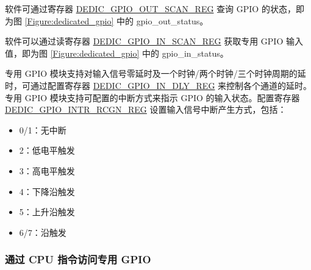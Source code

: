 \documentclass[main\_\_CN.tex]{subfiles}
\begin{document}
软件可通过寄存器 \hyperref[regdesc:DEDICGPIOOUTSCANREG]{DEDIC\_GPIO\_OUT\_SCAN\_REG} 查询 GPIO 的状态，即为图 \ref{Figure:dedicated_gpio} 中的 gpio\_out\_status。


软件可以通过读寄存器 \hyperref[regdesc:DEDICGPIOINSCANREG]{DEDIC\_GPIO\_IN\_SCAN\_REG} 获取专用 GPIO 输入值，即为图 \ref{Figure:dedicated_gpio} 中的 gpio\_in\_status。

专用 GPIO 模块支持对输入信号零延时及一个时钟/两个时钟/三个时钟周期的延时，可通过配置寄存器 \hyperref[regdesc:DEDICGPIOINDLYREG]{DEDIC\_GPIO\_IN\_DLY\_REG} 来控制各个通道的延时。 专用 GPIO 模块支持可配置的中断方式来指示 GPIO 的输入状态。配置寄存器 \hyperref[regdesc:DEDICGPIOINTRRCGNREG]{DEDIC\_GPIO\_INTR\_RCGN\_REG} 设置输入信号中断产生方式，包括：
\begin{itemize}
    \item 0/1：无中断
    \item 2：低电平触发
    \item 3：高电平触发
    \item 4：下降沿触发
    \item 5：上升沿触发
    \item 6/7：沿触发
\end{itemize}


\subsubsection{通过 CPU 指令访问专用 GPIO}\label{cpu_instructor}
\end{document}
